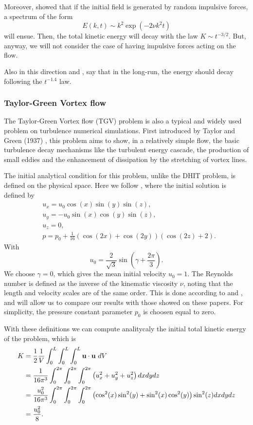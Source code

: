 Moreover, \cite{Staffman 1967} showed that if the initial field is generated by random impulsive forces, a spectrum of the form
\begin{equation}
\label{eq-DHIT_staffman_decay}
E(k,t)\sim k^2\exp(-2\nu k^2t)
\end{equation}
will ensue. Then, the total kinetic energy will decay with the law $K\sim t^{-3/2}$. But, anyway, we will not consider the case of having impulsive forces acting on the flow.

Also in this direction \cite{rohe_analysis_2010} and \cite{chalot_consistent_1998}, say that in the long-run, the energy should decay following the $t^{-1.4}$ law.

\subsubsection{Taylor-Green Vortex flow}
The Taylor-Green Vortex flow (TGV) problem is also a typical and widely used problem on turbulence numerical simulations. First introduced by Taylor and Green (1937) \cite{taylor}, this problem aims to show, in a relatively simple flow, the basic turbulence decay mechanisms like the turbulent energy cascade, the production of small eddies and the enhancement of dissipation by the stretching of vortex lines.

The initial analytical condition for this problem, unlike the DHIT problem, is defined on the physical space. Here we follow \cite{gassner_accuracy_????}, where the initial solution is defined by
\begin{align}
\label{eq-TGV_initial_condition}
&u_x=u_0\cos(x)\sin(y)\sin(z),\\\nonumber
&u_y=-u_0\sin(x)\cos(y)\sin(z),\\\nonumber
&u_z=0,\\\nonumber
&p=p_0+\frac{1}{16}\left(\cos(2x)+\cos(2y)\right)\left(\cos(2z)+2\right).
\end{align}
With
$$u_0=\frac{2}{\sqrt{3}}\sin\left(\gamma+\frac{2\pi}{3}\right).$$
We choose $\gamma=0$, which gives the mean initial velocity  $u_0=1$. The Reynolds number is defined as the inverse of the kinematic viscosity $\nu$, noting that the length and velocity scales are of the same order. This is done according to \cite{gassner_accuracy_????} and \cite{brachet_direct_1991}, and will allow us to compare our results with those showed on these papers. For simplicity, the pressure constant parameter $p_0$ is choosen equal to zero.

With these definitions we can compute analitycaly the initial total kinetic energy of the problem, which is 
\begin{align}
\label{eq-TGV_initial_energy}
K&=\frac{1}{2}\frac{1}{V}\int_0^L\int_0^L\int_0^L\u\cdot\u\ dV\\\nonumber
&=\frac{1}{16\pi^3}\int_0^{2\pi}\int_0^{2\pi}\int_0^{2\pi}\left(u_x^2+u_y^2+u_z^2\right)dxdydz\\\nonumber
&=\frac{u_0^2}{16\pi^3}\int_0^{2\pi}\int_0^{2\pi}\int_0^{2\pi}\left(\cos^2(x)\sin^2(y)+\sin^2(x)\cos^2(y)\right)\sin^2(z)dxdydz\\\nonumber
&=\frac{u_0^2}{8}.
\end{align}

